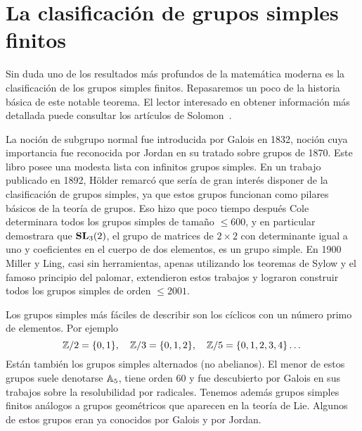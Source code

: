 
\section*{La clasificación de grupos simples finitos}

Sin duda uno de los resultados más profundos de la matemática moderna es la
clasificación de los grupos simples finitos. Repasaremos un poco de la historia
básica de este notable teorema. El lector interesado en obtener información más
detallada puede consultar los artículos de Solomon~\cite{MR1824893,MR3854074}. 

La noción de subgrupo normal fue introducida por Galois en 1832, noción cuya
importancia fue reconocida por Jordan en su tratado sobre grupos de 1870. Este
libro posee una modesta lista con infinitos grupos simples. En un trabajo
publicado en 1892, H\"older remarcó que sería de gran interés disponer de la
clasificación de grupos simples, ya que estos grupos funcionan como pilares básicos de la teoría de grupos. 
Eso hizo que poco tiempo después Cole determinara todos los grupos simples de tamaño $\leq600$, y en particular
demostrara que $\mathbf{SL}_3(2)$, el grupo de matrices de $2\times 2$ con determinante
igual a uno y coeficientes en el cuerpo de dos elementos, es un grupo simple. En 1900 
Miller y Ling, casi sin herramientas, apenas utilizando los teoremas de Sylow y 
el famoso principio del palomar, 
extendieron estos trabajos y lograron construir todos los grupos
simples de orden $\leq2001$. 

Los grupos simples más fáciles de describir son los cíclicos con un número
primo de elementos. Por ejemplo
\[
	\mathbb{Z}/2=\{0,1\},\quad
	\mathbb{Z}/3=\{0,1,2\},\quad
	\mathbb{Z}/5=\{0,1,2,3,4\}\dots
\]
Están también los grupos simples alternados (no abelianos). El menor de estos grupos suele
denotarse $\mathbb{A}_5$, tiene orden 60 y fue descubierto por Galois en sus trabajos
sobre la resolubilidad por radicales. Tenemos además grupos simples 
finitos análogos a grupos geométricos que aparecen en la teoría de Lie. Algunos
de estos grupos eran ya conocidos por Galois y por Jordan. 

